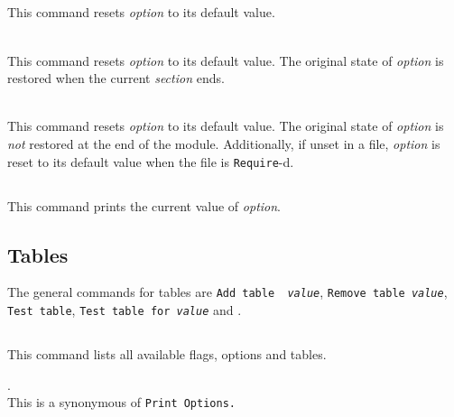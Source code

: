 \subsection[\tt Unset {\rm\sl option}.]{}
This command resets {\rm\sl option} to its default value.

\begin{Variants}
\item {}\\
This command resets {\rm\sl option} to its default value. The original state of {\rm\sl option}
is restored when the current \emph{section} ends.
\item {}\\
This command resets {\rm\sl option} to its default value.  The original state of
{\rm\sl option} is \emph{not} restored at the end of the module. Additionally,
if unset in a file, {\rm\sl option} is reset to its default value when the file is
{\tt Require}-d.
\end{Variants}

\subsection[\tt Test {\rm\sl option}.]{}
This command prints the current value of {\rm\sl option}.

\subsection{Tables}
The general commands for tables are {\tt Add {\rm\sf table} {\rm\sl
    value}}, {\tt Remove {\rm\sf table} {\rm\sl value}}, {\tt Test
    {\rm\sf table}}, {\tt Test {\rm\sf table} for {\rm\sl value}} and
  {}.

\subsection[\tt Print Options.]{}
This command lists all available flags, options and tables.

\begin{Variants}
\item {}.\\
This is a synonymous of {\tt Print Options.}
\end{Variants}

